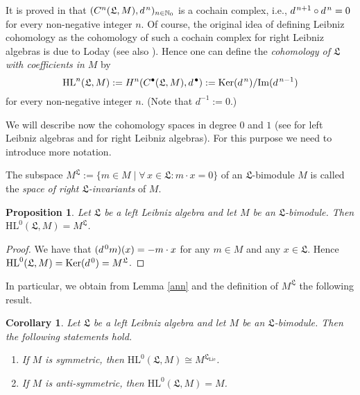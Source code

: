 \documentclass{amsart}
\newtheorem{pro}[thm]{Proposition}
\newtheorem{cor}[thm]{Corollary}
\numberwithin{equation}{section}
\newcommand{\lie}{\mathrm{Lie}}
\newcommand{\Ker}{\mathrm{Ker}}
\newcommand{\im}{\mathrm{Im}}
\newcommand{\HL}{\mathrm{HL}}
\newcommand{\N}{\mathbb{N}}
\newcommand{\lf}{\mathfrak{L}}
\begin{document}
It is proved in \cite[Lemma 1.3.1]{Co} that $(C^n(\lf,M),d\hspace{.4mm}^n)_{n\in\N_0}$
is a cochain complex, i.e., $d\hspace{.4mm}^{n+1}\circ d\hspace{.4mm}^n=0$ for every
non-negative integer $n$. Of course, the original idea of defining Leibniz cohomology as
the cohomology of such a cochain complex for right Leibniz algebras is due to Loday
\cite[(1.8)]{LP1} (see also \cite{Bl2}). Hence one can define the {\em cohomology of $\lf$
with coefficients in\/} $M$ by $$\HL^n(\lf,M):=H^n(C^\bullet(\lf,M),d\hspace{.4mm}^\bullet)
:=\Ker(d\hspace{.4mm}^n)/\im(d\hspace{.4mm}^{n-1})$$ for every non-negative integer $n$.
(Note that $d^{-1}:=0$.)

We will describe now the cohomology spaces in degree $0$ and $1$ (see \cite[Section~1.3.3]{Co}
for left Leibniz algebras and \cite[(1.8)]{LP1} for right Leibniz algebras). For this purpose we need
to introduce more notation.

The subspace $M^\lf:=\{m\in M\mid\forall\,x\in\lf:m\cdot x=0\}$ of an $\lf$-bimodule $M$ is
called the {\em space of right $\lf$-invariants\/} of $M$.

\begin{pro}\label{inv}
Let $\lf$ be a left Leibniz algebra and let $M$ be an $\lf$-bimodule. Then $\HL^0(\lf,M)=M^\lf$.
\end{pro}

\begin{proof}
We have that $(d\hspace{.4mm}^0m)(x)=-m\cdot x$ for any $m\in M$ and any $x\in\lf$. Hence $\HL^0(\lf,M)=\Ker(d\hspace{.4mm}^0)=M^\lf$.
\end{proof}

In particular, we obtain from Lemma \ref{ann} and the definition of $M^\lf$ the following
result.

\begin{cor}\label{asinv}
Let $\lf$ be a left Leibniz algebra and let $M$ be an $\lf$-bimodule. Then the following statements
hold.
\begin{enumerate}
\item[{\rm (a)}] If $M$ is symmetric, then $\HL^0(\lf,M)\cong M^{\lf_\lie}$.
\item[{\rm (b)}] If $M$ is anti-symmetric, then $\HL^0(\lf,M)=M$.
\end{enumerate}
\end{cor}
\end{document}
